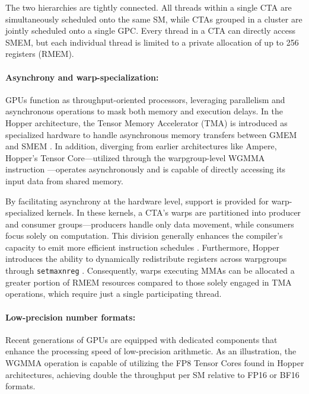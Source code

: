 The two hierarchies are tightly connected. All threads within a single CTA are simultaneously scheduled onto the same SM, while CTAs grouped in a cluster are jointly scheduled onto a single GPC. Every thread in a CTA can directly access SMEM, but each individual thread is limited to a private allocation of up to 256 registers (RMEM).

\paragraph{Asynchrony and warp-specialization:}

GPUs function as throughput-oriented processors, leveraging parallelism and asynchronous operations to mask both memory and execution delays. In the Hopper architecture, the Tensor Memory Accelerator (TMA) is introduced as specialized hardware to handle asynchronous memory transfers between GMEM and SMEM \cite[\S7.29]{cuda}. In addition, diverging from earlier architectures like Ampere, Hopper's Tensor Core—utilized through the warpgroup-level WGMMA instruction \cite[\S9.7.14]{ptx}—operates asynchronously and is capable of directly accessing its input data from shared memory.

By facilitating asynchrony at the hardware level, support is provided for warp-specialized kernels. In these kernels, a CTA’s warps are partitioned into producer and consumer groups—producers handle only data movement, while consumers focus solely on computation. This division generally enhances the compiler's capacity to emit more efficient instruction schedules \citep{warp-specialization-2011}. Furthermore, Hopper introduces the ability to dynamically redistribute registers across warpgroups through \verb|setmaxnreg| \cite[\S9.7.17.1]{ptx}. Consequently, warps executing MMAs can be allocated a greater portion of RMEM resources compared to those solely engaged in TMA operations, which require just a single participating thread.

\paragraph{Low-precision number formats:}
\label{sec:low-precision-gpu}
Recent generations of GPUs are equipped with dedicated components that enhance the processing speed of low-precision arithmetic. As an illustration, the WGMMA operation is capable of utilizing the FP8 Tensor Cores found in Hopper architectures, achieving double the throughput per SM relative to FP16 or BF16 formats.

